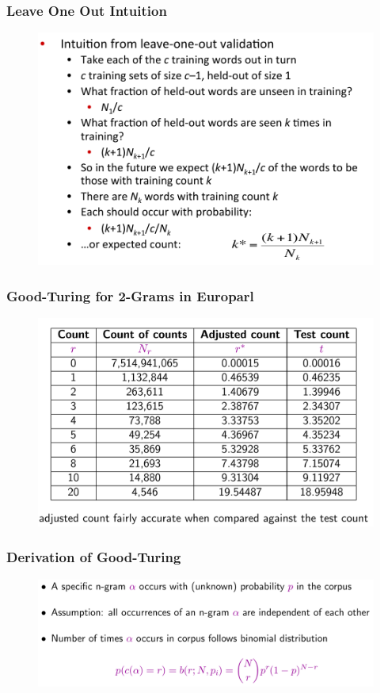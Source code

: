 \documentclass{beamer}
\begin{document}
\begin{frame}\frametitle{Leave One Out Intuition}
\begin{figure}
\includegraphics[width=0.9\linewidth]{figure/good_turing_loo_intuition.pdf}
\label{fig:good_turing_loo_intuition}
\end{figure}
\end{frame}


\begin{frame}\frametitle{Good-Turing for 2-Grams in Europarl}
\begin{figure}
\includegraphics[width=0.9\linewidth]{figure/good_turing_2gram.pdf}
\end{figure}
\end{frame}


\begin{frame}\frametitle{Derivation of Good-Turing}
\begin{figure}
\includegraphics[width=0.9\linewidth]{figure/derivation_good_turing.pdf}
\end{figure}
\end{frame}
\end{document}
